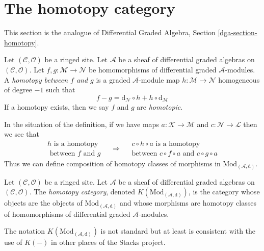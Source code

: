 \section{The homotopy category}
\label{section-homotopy}

\noindent
This section is the analogue of
Differential Graded Algebra, Section \ref{dga-section-homotopy}.

\begin{definition}
\label{definition-homotopy}
Let $(\mathcal{C}, \mathcal{O})$ be a ringed site.
Let $\mathcal{A}$ be a sheaf of differential graded algebras
on $(\mathcal{C}, \mathcal{O})$. Let
$f, g : \mathcal{M} \to \mathcal{N}$
be homomorphisms of differential graded $\mathcal{A}$-modules.
A {\it homotopy between $f$ and $g$} is a graded $\mathcal{A}$-module
map $h : \mathcal{M} \to \mathcal{N}$ homogeneous of degree $-1$
such that
$$
f - g = \text{d}_\mathcal{N} \circ h + h \circ \text{d}_\mathcal{M}
$$
If a homotopy exists, then we say $f$ and $g$ are {\it homotopic}.
\end{definition}

\noindent
In the situation of the definition, if we have maps
$a : \mathcal{K} \to \mathcal{M}$ and $c : \mathcal{N} \to \mathcal{L}$
then we see that
$$
\begin{matrix}
h\text{ is a homotopy} \\
\text{ between }f\text{ and } g
\end{matrix}
\quad
\Rightarrow
\quad
\begin{matrix}
c \circ h \circ a\text{ is a homotopy}\\
\text{between }
c \circ f \circ a\text{ and } c\circ g \circ a
\end{matrix}
$$
Thus we can define composition of homotopy classes of morphisms
in $\text{Mod}_{(\mathcal{A}, \text{d})}$.

\begin{definition}
\label{definition-complexes-notation}
Let $(\mathcal{C}, \mathcal{O})$ be a ringed site.
Let $\mathcal{A}$ be a sheaf of differential graded algebras
on $(\mathcal{C}, \mathcal{O})$.
The {\it homotopy category}, denoted $K(\text{Mod}_{(\mathcal{A}, \text{d})})$,
is the category whose objects are the objects of
$\text{Mod}_{(\mathcal{A}, \text{d})}$ and whose morphisms are homotopy classes
of homomorphisms of differential graded $\mathcal{A}$-modules.
\end{definition}

\noindent
The notation $K(\text{Mod}_{(\mathcal{A}, \text{d})})$
is not standard but at least is
consistent with the use of $K(-)$ in other places of the Stacks project.

